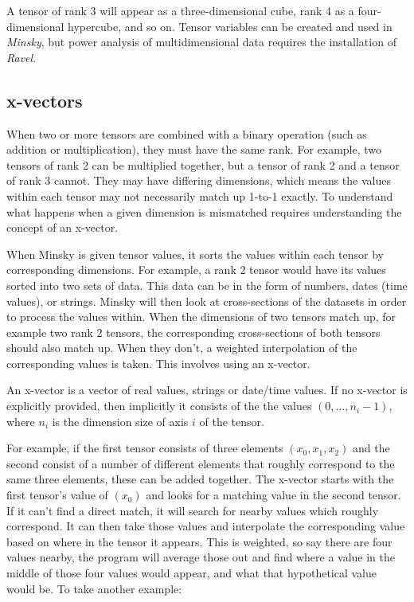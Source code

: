 A tensor of rank 3 will appear as a three-dimensional cube, rank 4
as a four-dimensional hypercube, and so on. Tensor variables can be
created and used in \emph{Minsky}, but power analysis of multidimensional
data requires the installation of \emph{Ravel}.

\subsection{x-vectors}

When two or more tensors are combined with a binary operation (such as
addition or multiplication), they must have the same rank. For
example, two tensors of rank 2 can be multiplied together, but a
tensor of rank 2 and a tensor of rank 3 cannot. They may have
differing dimensions, which means the values within each tensor may
not necessarily match up 1-to-1 exactly.  To understand what happens
when a given dimension is mismatched requires understanding the
concept of an x-vector\label{x-vector}.

When Minsky is given tensor values, it sorts the values within each
tensor by corresponding dimensions. For example, a rank 2 tensor would
have its values sorted into two sets of data. This data can be in the
form of numbers, dates (time values), or strings. Minsky will then
look at cross-sections of the datasets in order to process the values
within. When the dimensions of two tensors match up, for example two
rank 2 tensors, the corresponding cross-sections of both tensors
should also match up. When they don't, a weighted interpolation of the
corresponding values is taken. This involves using an x-vector.

An x-vector is a vector of real values, strings or date/time values.
If no x-vector is explicitly provided, then implicitly it consists of
the the values $(0,\ldots,n_i-1)$, where $n_i$ is the dimension size
of axis $i$ of the tensor.

For example, if the first tensor consists of three elements
$(x_0, x_1, x_2)$ and the second consist of a number of different
elements that roughly correspond to the same three elements, these can
be added together.  The x-vector starts with the first tensor's value
of $(x_0)$ and looks for a matching value in the second tensor. If it
can't find a direct match, it will search for nearby values which
roughly correspond. It can then take those values and interpolate the
corresponding value based on where in the tensor it appears. This is
weighted, so say there are four values nearby, the program will
average those out and find where a value in the middle of those four
values would appear, and what that hypothetical value would be. To
take another example:


